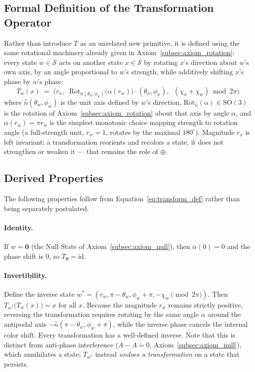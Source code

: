 \documentclass[12pt, a4paper]{article}
\begin{document}
\subsection{Formal Definition of the Transformation Operator}
\label{subsec:transform_definition}
Rather than introduce $T$ as an unrelated new primitive, it is defined
using the same rotational machinery already given in
Axiom~\ref{subsec:axiom_rotation}: every state $w \in \mathcal{S}$
acts on another state $x \in \mathcal{S}$ by rotating $x$'s direction
about $w$'s own axis, by an angle proportional to $w$'s strength, while
additively shifting $x$'s phase by $w$'s phase:
\begin{equation}
    T_w(x) \;=\; \Big(r_x,\;\; \mathrm{Rot}_{\hat n(\theta_w,\phi_w)}\!\big(\alpha(r_w)\big)\cdot(\theta_x,\phi_x),\;\; (\chi_x + \chi_w) \bmod 2\pi\Big)
    \label{eq:transform_def}
\end{equation}
where $\hat n(\theta_w,\phi_w)$ is the unit axis defined by $w$'s
direction, $\mathrm{Rot}_{\hat n}(\alpha) \in \mathrm{SO}(3)$ is the
rotation of Axiom~\ref{subsec:axiom_rotation} about that axis by angle
$\alpha$, and $\alpha(r_w) = \pi r_w$ is the simplest monotonic choice
mapping strength to rotation angle (a full-strength unit, $r_w = 1$,
rotates by the maximal $180^\circ$). Magnitude $r_x$ is left invariant:
a transformation reorients and recolors a state, it does not
strengthen or weaken it --- that remains the role of $\oplus$.

\subsection{Derived Properties}
\label{subsec:transform_properties}
The following properties follow from Equation~\eqref{eq:transform_def}
rather than being separately postulated.

\paragraph{Identity.} If $w = \mathbf{0}$ (the Null State of
Axiom~\ref{subsec:axiom_null}), then $\alpha(0) = 0$ and the phase
shift is $0$, so $T_{\mathbf{0}} = \mathrm{id}$.

\paragraph{Invertibility.} Define the inverse state $w^{*} = (r_w, \pi - \theta_w, \phi_w + \pi, -\chi_w \pmod{2\pi})$. 
Then $T_{w^{*}}\!\big(T_w(x)\big) = x$ for all $x$. Because the magnitude $r_w$ remains strictly positive, reversing the transformation requires rotating by the same angle $\alpha$ around the antipodal axis $-\hat{n}(\pi - \theta_w, \phi_w + \pi)$, while the inverse phase cancels the internal color shift. Every transformation has a well-defined inverse. Note that this is distinct from anti-phase interference ($A - A = 0$, Axiom~\ref{subsec:axiom_null}), which annihilates a state; $T_{w^{*}}$ instead \emph{undoes a transformation} on a state that persists.
\end{document}

